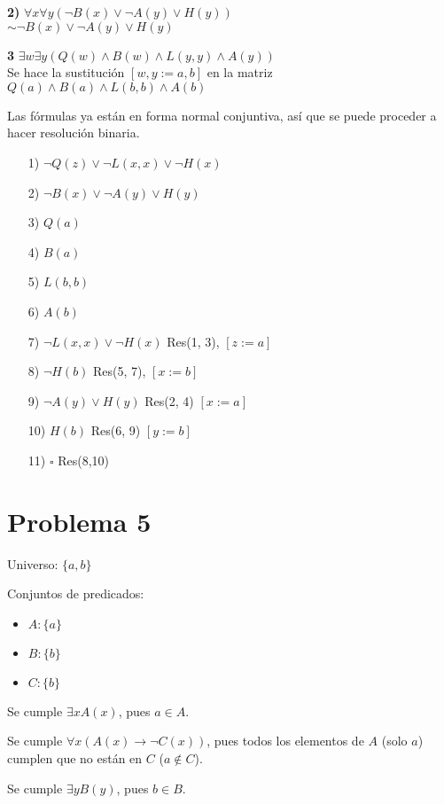\documentclass{article}
\begin{document}
\textbf{2)} $\forall x \forall y (\lnot B(x) \lor \lnot A(y) \lor H(y))$\\
$\sim \lnot B(x) \lor \lnot A(y) \lor H(y)$

\textbf{3} $\exists w \exists y (Q(w) \land B(w) \land L(y,y) \land A(y))$\\
Se hace la sustitución $[w,y := a,b]$ en la matriz\\
$Q(a) \land B(a) \land L(b,b) \land A(b)$

Las fórmulas ya están en forma normal conjuntiva, así que se puede proceder a hacer resolución binaria.

\begin{itemize}
\item[1)] $\lnot Q(z) \lor \lnot L(x,x) \lor \lnot H(x)$
\item[2)] $\lnot B(x) \lor \lnot A(y) \lor H(y)$
\item[3)] $Q(a)$
\item[4)] $B(a)$
\item[5)] $L(b,b)$
\item[6)] $A(b)$
\item[7)] $\lnot L(x,x) \lor \lnot H(x)$ Res(1, 3), $[z:=a]$
\item[8)] $\lnot H(b)$ Res(5, 7), $[x:=b]$
\item[9)] $\lnot A(y) \lor H(y)$ Res(2, 4) $[x:=a]$
\item[10)] $H(b)$ Res(6, 9) $[y:=b]$
\item[11)] $\square$ Res(8,10)
\end{itemize}

\section*{Problema 5}

Universo: $\{a, b\}$

Conjuntos de predicados:
\begin{itemize}
\item $A: \{ a \}$
\item $B: \{ b \}$
\item $C: \{ b \}$
\end{itemize}

Se cumple $\exists x A(x)$, pues $a \in A$.

Se cumple $\forall x (A(x) \rightarrow \lnot C(x))$, pues todos los elementos de $A$ (solo $a$) cumplen que no están en $C$ ($a \not \in C$).

Se cumple $\exists y B(y)$, pues $b \in B$.
\end{document}
